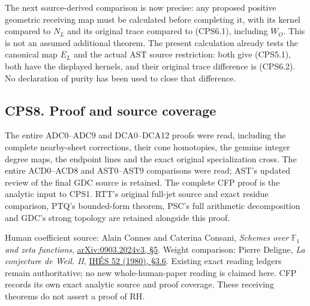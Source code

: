The next source-derived comparison is now precise: any proposed positive
geometric receiving map must be calculated before completing it, with
its kernel compared to \(N_L\) and its original trace compared to
(CPS6.1), including \(W_O\). This is not an assumed additional theorem.
The present calculation already tests the canonical map \(E_L\) and the
actual AST source restriction: both give (CPS5.1), both have the
displayed kernels, and their original trace difference is (CPS6.2). No
declaration of purity has been used to close that difference.

\subsection{CPS8. Proof and source
coverage}\label{cps8.-proof-and-source-coverage}

The entire ADC0--ADC9 and DCA0--DCA12 proofs were read, including the
complete nearby-sheet corrections, their cone homotopies, the genuine
integer degree maps, the endpoint lines and the exact original
specialization cross. The entire ACD0--ACD8 and AST0--AST9 comparisons
were read; AST's updated review of the final GDC source is retained. The
complete CFP proof is the analytic input to CPS1. RTT's original
full-jet source and exact residue comparison, PTQ's bounded-form
theorem, PSC's full arithmetic decomposition and GDC's strong topology
are retained alongside this proof.

Human coefficient source: Alain Connes and Caterina Consani,
\emph{Schemes over} \(\mathbb F_1\) \emph{and zeta functions},
\href{https://arxiv.org/abs/0903.2024v3}{arXiv:0903.2024v3, §5}. Weight
comparison: Pierre Deligne, \emph{La conjecture de Weil. II},
\href{https://numdam.org/item/PMIHES_1980__52__137_0/}{IHÉS 52 (1980),
§3.6}. Existing exact reading ledgers remain authoritative; no new
whole-human-paper reading is claimed here. CFP records its own exact
analytic source and proof coverage. These receiving theorems do not
assert a proof of RH.
